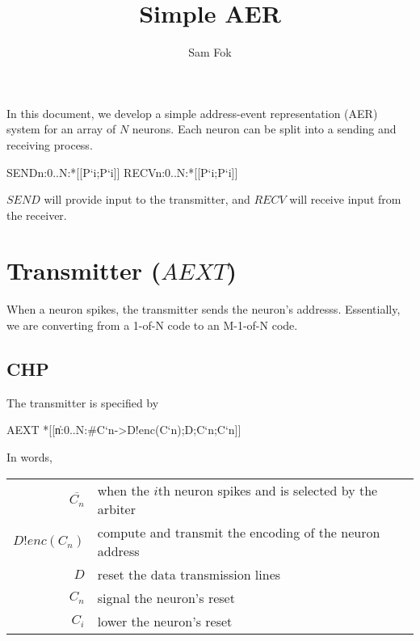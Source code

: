 \documentclass{article}
\begin{document}
\title{Simple AER}
\author{Sam Fok}
\maketitle

In this document, we develop a simple address-event representation (AER) system for an array of $N$ neurons. Each neuron can be split into a sending and receiving process. 

\begin{csp}
SEND\equiv\langle\pll\!n:0..N:*[[P`i;P`i]]\rangle
RECV\equiv\langle\pll\!n:0..N:*[[P`i;P`i]]\rangle
\end{csp}

\noindent $SEND$ will provide input to the transmitter, and $RECV$ will receive input from the receiver.

\section{Transmitter ($AEXT$)}

When a neuron spikes, the transmitter sends the neuron's addresss. Essentially, we are converting from a 1-of-N code to an M-1-of-N code.

\subsection{CHP}
The transmitter is specified by

\begin{csp}
AEXT\equiv
  *[[\langle\|n:0..N:#{C`n}->D!enc(C`n);D;C`n;C`n\rangle]]
\end{csp}

\noindent In words,

\begin{tabular}[]{rl}
  $\overline{C_n}$ & when the $i$th neuron spikes and is selected by the arbiter \\
  $D!enc(C_n)$ & compute and transmit the encoding of the neuron address \\
  $D$ & reset the data transmission lines \\
  $C_n$ & signal the neuron's reset \\
  $C_i$ & lower the neuron's reset \\
\end{tabular} \\
\end{document}
